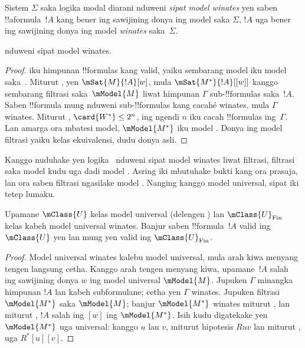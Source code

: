 \documentclass[../../../include/open-logic-section]{subfiles}
\begin{document}


\begin{defn}
  Sistem $\Sigma$ saka logika modal diarani nduweni \emph{sipat model
    winates} yen saben !!a{formula}~$!A$ kang bener ing sawijining
  donya ing model saka $\Sigma$, $!A$ uga bener ing sawijining donya ing
  model \emph{winates} saka~$\Sigma$.
\end{defn}

\begin{prop}
   nduweni sipat model winates.
\end{prop}

\begin{proof}
   iku himpunan !!{formula}s kang valid, yaiku sembarang model
  iku model saka~. Miturut , yen
  $\mSat{M}{!A}[w]$, mula $\mSat{M^*}{!A}[{[w]}]$ kanggo sembarang
  filtrasi saka~$\mModel{M}$ liwat himpunan $\Gamma$ sub-!!{formula}s
  saka~$!A$. Saben !!{formula} mung nduweni sub-!!{formula}s kang
  cacahé winates, mula $\Gamma$ winates. Miturut
  , $\card{W^*} \le 2^n$, ing ngendi
  $n$ iku cacah !!{formula}s ing~$\Gamma$. Lan amarga  ora
  mbatesi model, $\mModel{M^*}$ iku model . Donya ing model filtrasi yaiku kelas ekuivalensi, dudu donya asli.
\end{proof}

Kanggo nuduhake yen logika~ nduweni sipat model winates liwat
filtrasi, filtrasi saka model  kudu uga dadi model .
Asring iki mbutuhake bukti kang ora prasaja, lan ora saben filtrasi
ngasilake model . Nanging kanggo model universal, sipat iki
tetep lumaku.

\begin{prop}
  Upamane $\mClass{U}$ kelas model universal (delengen
  ) lan $\mClass{U}_\mathrm{Fin}$ kelas
  kabeh model universal winates. Banjur saben !!{formula}~$!A$ valid
  ing $\mClass{U}$ yen lan mung yen valid ing
  $\mClass{U}_\mathrm{Fin}$.
\end{prop}

\begin{proof}
  Model universal winates kalebu model universal, mula arah kiwa
  menyang tengen langsung cetha. Kanggo arah tengen menyang kiwa,
  upamane~$!A$ salah ing sawijining donya $w$ ing model universal
  $\mModel{M}$. Jupuken $\Gamma$ minangka himpunan $!A$ lan kabeh
  subformulane; cetha yen $\Gamma$ winates. Jupuken filtrasi
  $\mModel{M^*}$ saka $\mModel{M}$; banjur $\mModel{M^*}$ winates
  miturut , lan miturut
  , $!A$ salah ing $[w]$ ing
  $\mModel{M^*}$. Isih kudu digatekake yen $\mModel{M^*}$ uga
  universal: kanggo $u$ lan $v$, miturut hipotesis $Ruv$ lan miturut
  ,
  uga $R^*[u][v]$.
\end{proof}
\end{document}
